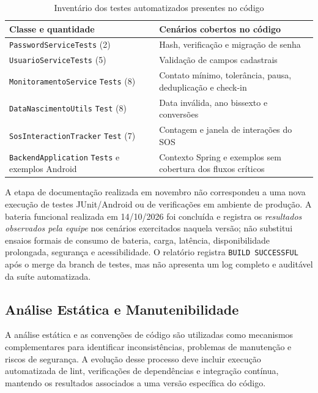 \begin{table}[H]
\caption{Inventário dos testes automatizados presentes no código}
\label{tab_resultados_testes}
\centering\footnotesize
\renewcommand{\arraystretch}{1.15}
\begin{tabular}{p{4.3cm}p{8.6cm}}\hline
\textbf{Classe e quantidade} & \textbf{Cenários cobertos no código}\\\hline
\texttt{PasswordServiceTests} (2) & Hash, verificação e migração de senha\\\hline
\texttt{UsuarioServiceTests} (5) & Validação de campos cadastrais\\\hline
\texttt{MonitoramentoService} \texttt{Tests} (8) & Contato mínimo, tolerância, pausa, deduplicação e check-in\\\hline
\texttt{DataNascimentoUtils} \texttt{Test} (8) & Data inválida, ano bissexto e conversões\\\hline
\texttt{SosInteractionTracker} \texttt{Test} (7) & Contagem e janela de interações do SOS\\\hline
\texttt{BackendApplication} \texttt{Tests} e exemplos Android & Contexto Spring e exemplos sem cobertura dos fluxos críticos\\\hline
\end{tabular}
\end{table}

A etapa de documentação realizada em novembro não correspondeu a uma nova execução de testes JUnit/Android ou de verificações em ambiente de produção. A bateria funcional realizada em 14/10/2026 foi concluída e registra os \textit{resultados observados pela equipe} nos cenários exercitados naquela versão; não substitui ensaios formais de consumo de bateria, carga, latência, disponibilidade prolongada, segurança e acessibilidade. O relatório registra \texttt{BUILD SUCCESSFUL} após o merge da branch de testes, mas não apresenta um log completo e auditável da suíte automatizada.

\subsection{Análise Estática e Manutenibilidade}

A análise estática e as convenções de código são utilizadas como mecanismos complementares para identificar inconsistências, problemas de manutenção e riscos de segurança. A evolução desse processo deve incluir execução automatizada de lint, verificações de dependências e integração contínua, mantendo os resultados associados a uma versão específica do código.

